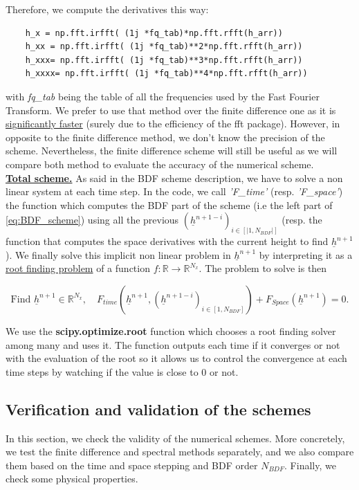\documentclass[12pt]{article}
\begin{document}
Therefore, we compute the derivatives this way:
\begin{verbatim}
    h_x = np.fft.irfft( (1j *fq_tab)*np.fft.rfft(h_arr))
    h_xx = np.fft.irfft( (1j *fq_tab)**2*np.fft.rfft(h_arr))
    h_xxx= np.fft.irfft( (1j *fq_tab)**3*np.fft.rfft(h_arr))
    h_xxxx= np.fft.irfft( (1j *fq_tab)**4*np.fft.rfft(h_arr))
\end{verbatim}
with \textit{fq\_tab} being the table of all the frequencies used by the Fast Fourier Transform. 
We prefer to use that method over the finite difference one as it is \underline{significantly faster} (surely due to the efficiency of the fft package). However, in opposite to the finite difference method, we don't know the precision of the scheme. 
Nevertheless, the finite difference scheme will still be useful as we will compare both method to evaluate the accuracy of the numerical scheme. 
\\

\underline{\textbf{Total scheme.}} As said in the BDF scheme description, we have to solve a non linear system at each time step. In the code, we call \textit{'F\_time'} (resp. \textit{'F\_space'}) the function which computes the BDF part 
of the scheme (i.e the left part of \eqref{eq:BDF_scheme}) using all the previous $(\underline{h}^{n+1-i})_{i\in [|1, N_{BDF}|]}$  (resp. the function that computes the space derivatives with the current height to find $\underline{h}^{n+1}$ ).
We finally solve this implicit non linear problem in $\underline{h}^{n+1}$  by interpreting it as a \underline{root finding problem} of a function $f:\mathbb{R}\rightarrow \mathbb{R}^{N_x}$. The problem to solve is then 

\begin{equation}
    \boxed{
    \text{Find } \underline{h}^{n+1} \in \mathbb{R}^{N_x}, \quad F_{time}(\underline{h}^{n+1}, (\underline{h}^{n+1-i})_{i\in [1, N_{BDF}]})+F_{Space}(\underline{h}^{n+1})=0.
    }
\end{equation}

We use the \textbf{scipy.optimize.root} function which chooses a root finding solver among many and uses it. The function outputs each time if it converges or not with the evaluation of the root so it allows us to control the convergence at each time steps by watching if the value is close to 0 or not. 



\subsection{Verification and validation of the schemes}
In this section, we check the validity of the numerical schemes. More concretely, we test the finite difference and spectral methods separately, and we also 
compare them based on the time and space stepping and BDF order $N_{BDF}$. Finally, we check some physical properties.
\\
\end{document}
